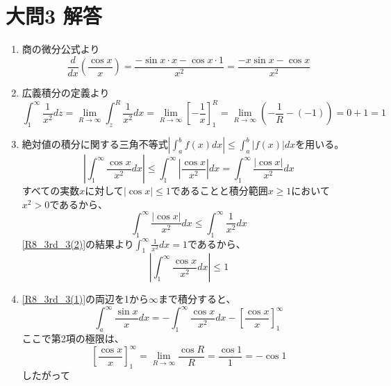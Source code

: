 \documentclass[dvipdfmx]{jsreport}
\begin{document}
\section{大問3 解答}
\begin{souanswer} %
\begin{enumerate}
    \item\label{R8_3rd_3(1)} 商の微分公式より
\begin{equation*}
    \frac{d}{dx}\left(\frac{\cos{x}}{x}\right)= \frac{-\sin{x}\cdot x- \cos{x}\cdot 1}{x^2}= \frac{-x\sin{x}- \cos{x}}{x^2}
\end{equation*}
    \item\label{R8_3rd_3(2)} 広義積分の定義より
\begin{equation*}
    \int_1^\infty \frac{1}{x^2}dz
	= \lim_{R\to \infty}\int_z^R \frac{1}{x^2}dx
    = \lim_{R\to \infty} \left[-\frac{1}{x}\right]_1^R
    = \lim_{R\to \infty}\left(-\frac{1}{R}- (-1)\right)= 0+ 1= 1
\end{equation*}
    \item\label{R8_3rd_3(3)} 絶対値の積分に関する三角不等式$\left|\int_a^b f(x)dx\right|\le \int_a^b|f(x)|dx$を用いる。
\begin{equation*}
	\left|\int_1^\infty \frac{\cos{x}}{x^2}dx \right|
	\le \int_1^\infty \left|\frac{\cos{x}}{x^2}\right|dx
	= \int_1^\infty \frac{|\cos{x}|}{x^2}dx
\end{equation*}
	すべての実数$x$に対して$|\cos{x}|\le 1$であることと積分範囲$x\ge 1$において$x^2> 0$であるから、
\begin{equation*}
	\int_1^\infty \frac{|\cos{x}|}{x^2}dx\le \int_1^\infty \frac{1}{x^2}dx
\end{equation*}
	\ref{R8_3rd_3(2)}の結果より$\int_1^\infty \frac{1}{x^2}dx= 1$であるから、
\begin{equation*}
	\left|\int_1^\infty \frac{\cos{x}}{x^2}dx\right|\le 1
\end{equation*}
	\item \ref{R8_3rd_3(1)}の両辺を1から$\infty$まで積分すると、
\begin{equation*}
	\int_a^\infty \frac{\sin{x}}{x}dx= -\int_1^\infty \frac{\cos{x}}{x^2}dx- \left[\frac{\cos{x}}{x}\right]_1^\infty
\end{equation*}
	ここで第2項の極限は、
\begin{equation*}
	\left[\frac{\cos{x}}{x}\right]_1^\infty= \lim_{R\to \infty}\frac{\cos{R}}{R}= \frac{\cos{1}}{1}= -\cos{1}
\end{equation*}
	したがって
\begin{equation*}

\end{equation*}
\end{enumerate}
\end{souanswer}
\end{document}
